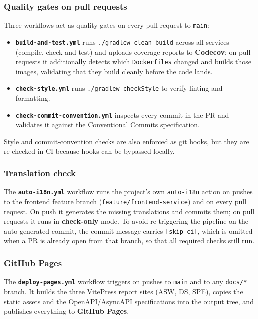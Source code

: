 \subsubsection{Quality gates on pull requests}

Three workflows act as quality gates on every pull request to \texttt{main}:

\begin{itemize}
  \item \textbf{\texttt{build-and-test.yml}} runs \texttt{./gradlew clean build} across all services (compile, check and test) and uploads coverage reports to \textbf{Codecov}; on pull requests it additionally detects which \texttt{Dockerfiles} changed and builds those images, validating that they build cleanly before the code lands.
  \item \textbf{\texttt{check-style.yml}} runs \texttt{./gradlew checkStyle} to verify linting and formatting.
  \item \textbf{\texttt{check-commit-convention.yml}} inspects every commit in the PR and validates it against the Conventional Commits specification.
\end{itemize}

Style and commit-convention checks are also enforced as git hooks, but they are re-checked in CI because hooks can be bypassed locally.

\subsubsection{Translation check}

The \textbf{\texttt{auto-i18n.yml}} workflow runs the project's own \texttt{auto-i18n} action on pushes to the frontend feature branch (\texttt{feature/frontend-service}) and on every pull request. On push it generates the missing translations and commits them; on pull requests it runs in \textbf{check-only} mode. To avoid re-triggering the pipeline on the auto-generated commit, the commit message carries \texttt{[skip ci]}, which is omitted when a PR is already open from that branch, so that all required checks still run.

\subsubsection{GitHub Pages}

The \textbf{\texttt{deploy-pages.yml}} workflow triggers on pushes to \texttt{main} and to any \texttt{docs/*} branch. It builds the three VitePress report sites (ASW, DS, SPE), copies the static assets and the OpenAPI/AsyncAPI specifications into the output tree, and publishes everything to \textbf{GitHub Pages}.

